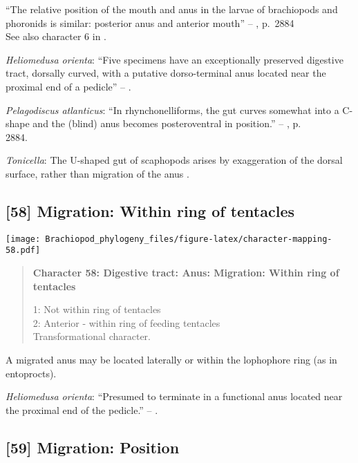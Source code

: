 \documentclass[openany]{book}
\theoremstyle{definition}
\theoremstyle{definition}
\theoremstyle{definition}
\theoremstyle{remark}
\begin{document}
``The relative position of the mouth and anus in the larvae of
brachiopods and phoronids is similar: posterior anus and anterior
mouth'' -- \citet{Williams2007Supplement}, p.~2884\\
See also character 6 in \citet{Haszprunar2008}.

\hypertarget{Heliomedusa_orienta-coding-57}{}
\emph{Heliomedusa orienta}: ``Five specimens have an exceptionally
preserved digestive tract, dorsally curved, with a putative
dorso-terminal anus located near the proximal end of a pedicle'' --
\citet{Zhang2007Rhynchonelliformeanbrachiopods}.

\hypertarget{Pelagodiscus_atlanticus-coding-57}{}
\emph{Pelagodiscus atlanticus}: ``In rhynchonelliforms, the gut curves
somewhat into a C-shape and the (blind) anus becomes posteroventral in
position.'' -- \citet{Williams2007Supplement}, p.\\
2884.

\hypertarget{Tonicella-coding-57}{}
\emph{Tonicella}: The U-shaped gut of scaphopods arises by exaggeration
of the dorsal surface, rather than migration of the anus
\citep{Steiner1992}.

\subsection*{{[}58{]} Migration: Within ring of
tentacles}\label{migration-within-ring-of-tentacles}

\texttt{[image: Brachiopod\_phylogeny\_files/figure-latex/character-mapping-58.pdf]}

\begin{quote}
\textbf{Character 58: Digestive tract: Anus: Migration: Within ring of
tentacles}

1: Not within ring of tentacles\\
2: Anterior - within ring of feeding tentacles\\
Transformational character.
\end{quote}

A migrated anus may be located laterally or within the lophophore ring
(as in entoprocts).

\hypertarget{Heliomedusa_orienta-coding-58}{}
\emph{Heliomedusa orienta}: ``Presumed to terminate in a functional anus
located near the proximal end of the pedicle.'' --
\citet{Zhang2007Rhynchonelliformeanbrachiopods}.

\subsection*{{[}59{]} Migration: Position}\label{migration-position}
\end{document}
